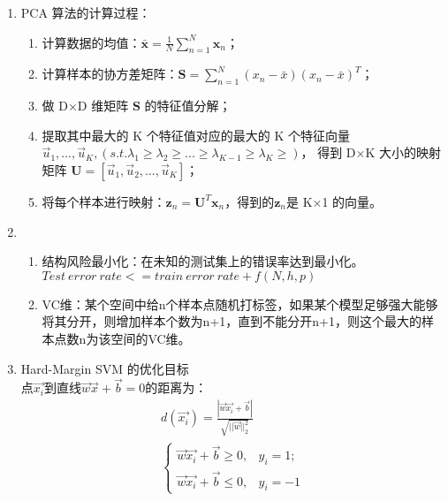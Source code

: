 \documentclass[a4paper,11pt,onecolumn,oneside,UTF8]{article}
\begin{document}
\begin{enumerate}
    \item
          PCA 算法的计算过程：\\
          \begin{enumerate}[(1)]
              \item 计算数据的均值：$\bar{\boldsymbol{x}} = \frac{1}{N}\sum \limits_{n=1}^N\boldsymbol{x}_n$；
              \item 计算样本的协方差矩阵：$\mathbf{S}=\sum \limits_{n=1}^N\left(x_n-\bar x\right)\left(x_n-\bar x\right)^T$；
              \item 做 D×D 维矩阵 $\mathbf{S}$ 的特征值分解；
              \item 提取其中最大的 K 个特征值对应的最大的 K 个特征向量 $\vec{u}_1,...,\vec{u}_K,\left(s.t. \lambda_1 \geq \lambda_2 \geq ...\geq \lambda_{K-1} \geq \lambda_{K} \geq \right)$，
                    得到 D×K 大小的映射矩阵 $\mathbf{U} = \left[\vec{u}_1,\vec{u}_2,...,\vec{u}_K\right]$；
              \item 将每个样本进行映射：$\boldsymbol{z}_n = \mathbf{U}^T\boldsymbol{x}_n$，得到的$\boldsymbol{z}_n$是 K×1 的向量。
          \end{enumerate}
    \item
          \begin{enumerate}[(1)]
              \item 结构风险最小化：在未知的测试集上的错误率达到最小化。$Test\ error\ rate <= train\ error\ rate + f(N, h, p)$
              \item VC维：某个空间中给n个样本点随机打标签，如果某个模型足够强大能够将其分开，则增加样本个数为n+1，直到不能分开n+1，则这个最大的样本点数n为该空间的VC维。
          \end{enumerate}
    \item
          Hard-Margin SVM 的优化目标\\
          点$\vec{x_i}$到直线$\vec{w}\vec{x}+\vec{b}=0$的距离为：
          $$
              \begin{aligned}
                  d\left(\vec{x_i}\right) = \frac{|\vec{w}\vec{x_i}+\vec{b}|}{\sqrt{||\vec{w}||_2^2}} \\
                  \left\{\begin{array}{ll}
                      \vec{w}\vec{x_i}+\vec{b}\geq 0, & y_i=1; \\
                      \vec{w}\vec{x_i}+\vec{b}\leq 0, & y_i=-1
                  \end{array}
                  \right.
              \end{aligned}
$$
\end{enumerate}
\end{document}
